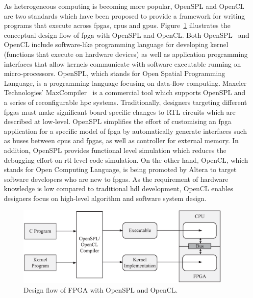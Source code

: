 As heterogeneous computing is becoming more popular, OpenSPL and OpenCL are two standards which have been proposed to provide a framework for writing programs that execute across \glspl{fpga}, \glspl{cpu} and \glspl{gpu}.
Figure~\ref{fig:openspl} illustrates the conceptual design flow of \gls{fpga} with OpenSPL and OpenCL.
Both OpenSPL~\cite{openspl} and OpenCL include software-like programming language for developing kernel (functions that execute on hardware devices) as well as application programming interfaces that allow kernels communicate with software executable running on micro-processors.
OpenSPL, which stands for Open Spatial Programming Language, is a programming language focusing on data-flow computing.
Maxeler Technologies' MaxCompiler~\cite{maxcompiler} is a commercial tool which supports OpenSPL and a series of reconfigurable \gls{hpc} systems.
Traditionally, designers targeting different \glspl{fpga} must make significant board-specific changes to RTL circuits which are described at low-level.
OpenSPL simplifies the effort of customising an \gls{fpga} application for a specific model of \gls{fpga} by automatically generate interfaces such as buses between \glspl{cpu} and \glspl{fpga}, as well as controller for external memory.
In addition, OpenSPL provides functional level simulation which reduces the debugging effort on \gls{rtl}-level code simulation.
On the other hand, OpenCL, which stands for Open Computing Language, is being promoted by Altera to target software developers who are new to \glspl{fpga}.
As the requirement of hardware knowledge is low compared to traditional \gls{hdl} development, OpenCL enables designers focus on high-level algorithm and software system design.

\begin{figure}[ht]
\begin{center}
\includegraphics[width=0.95\textwidth]{2_background/figures/openspl}
\end{center}
\caption{Design flow of FPGA with OpenSPL and OpenCL.}
\label{fig:openspl}
\end{figure}

